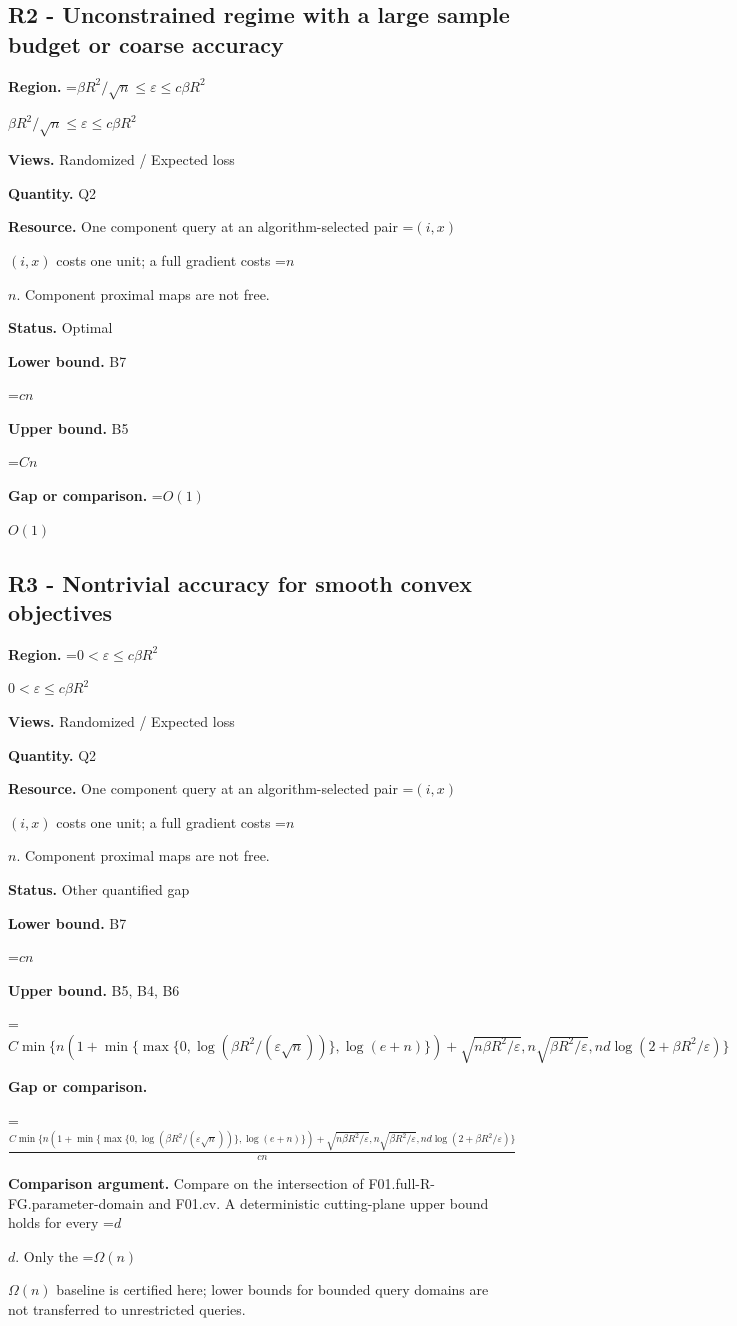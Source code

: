 \documentclass[10pt,a4paper]{article}
\newcommand{\AtlasMath}[1]{\par\begingroup\centering\setbox0=\hbox{$\displaystyle #1$}\ifdim\wd0>1.4\linewidth\typeout{ATLAS WIDE FORMULA: \the\wd0}\fi\ifdim\wd0>\linewidth\resizebox{\linewidth}{!}{\box0}\else\box0\fi\par\endgroup}
\newcommand{\AtlasInlineMath}[1]{\begingroup\setbox0=\hbox{$#1$}\ifdim\wd0>.4\linewidth\endgroup\AtlasMath{#1}\else\endgroup$#1$\fi}
\begin{document}
\subsection{R2 - Unconstrained regime with a large sample budget or coarse accuracy}
\textbf{Region.} \AtlasInlineMath{\beta R^2/\sqrt n\le\varepsilon\le c\beta R^2}

\textbf{Views.} Randomized / Expected loss

\textbf{Quantity.} Q2

\textbf{Resource.} One component query at an algorithm-selected pair \AtlasInlineMath{(i,x)} costs one unit; a full gradient costs \AtlasInlineMath{n}. Component proximal maps are not free.

\textbf{Status.} Optimal

\textbf{Lower bound.} B7

\AtlasMath{cn}
\textbf{Upper bound.} B5

\AtlasMath{Cn}
\textbf{Gap or comparison.} \AtlasInlineMath{O(1)}

\subsection{R3 - Nontrivial accuracy for smooth convex objectives}
\textbf{Region.} \AtlasInlineMath{0<\varepsilon\le c\beta R^2}

\textbf{Views.} Randomized / Expected loss

\textbf{Quantity.} Q2

\textbf{Resource.} One component query at an algorithm-selected pair \AtlasInlineMath{(i,x)} costs one unit; a full gradient costs \AtlasInlineMath{n}. Component proximal maps are not free.

\textbf{Status.} Other quantified gap

\textbf{Lower bound.} B7

\AtlasMath{cn}
\textbf{Upper bound.} B5, B4, B6

\AtlasMath{C\min\{n(1+\min\{\max\{0,\log(\beta R^2/(\varepsilon\sqrt n))\},\log(e+n)\})+\sqrt{n\beta R^2/\varepsilon},n\sqrt{\beta R^2/\varepsilon},nd\log(2+\beta R^2/\varepsilon)\}}
\textbf{Gap or comparison.} 
\AtlasMath{\frac{C\min\{n(1+\min\{\max\{0,\log(\beta R^2/(\varepsilon\sqrt n))\},\log(e+n)\})+\sqrt{n\beta R^2/\varepsilon},n\sqrt{\beta R^2/\varepsilon},nd\log(2+\beta R^2/\varepsilon)\}}{cn}}


\textbf{Comparison argument.} Compare on the intersection of F01.full-R-FG.parameter-domain and F01.cv. A deterministic cutting-plane upper bound holds for every \AtlasInlineMath{d}. Only the \AtlasInlineMath{\Omega(n)} baseline is certified here; lower bounds for bounded query domains are not transferred to unrestricted queries.
\end{document}
